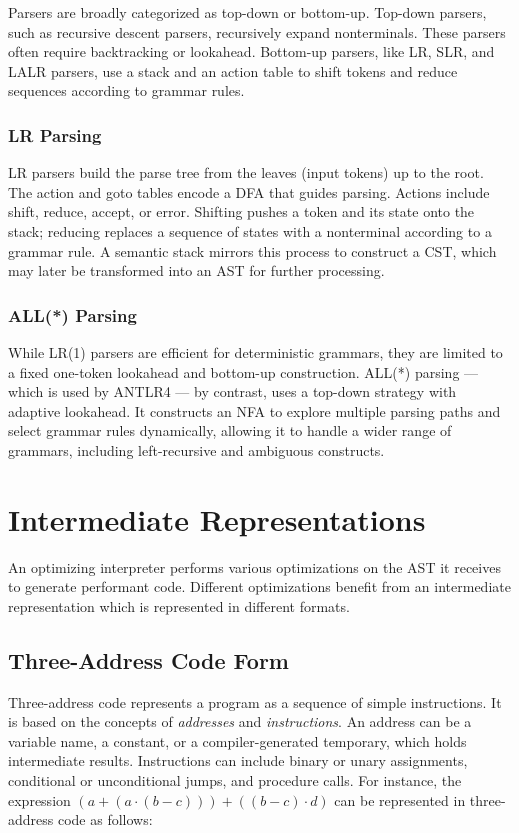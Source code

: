 Parsers are broadly categorized as top-down or bottom-up. Top-down parsers, such as recursive descent parsers, recursively expand nonterminals. These parsers often require backtracking or lookahead. Bottom-up parsers, like LR, SLR, and LALR parsers, use a stack and an action table to shift tokens and reduce sequences according to grammar rules\cite{kegler2014}.

\subsubsection{LR Parsing}
LR parsers build the parse tree from the leaves (input tokens) up to the root. The action and goto tables encode a \ac{DFA} that guides parsing. Actions include shift, reduce, accept, or error. Shifting pushes a token and its state onto the stack; reducing replaces a sequence of states with a nonterminal according to a grammar rule. A semantic stack mirrors this process to construct a \ac{CST}, which may later be transformed into an \ac{AST} for further processing\cite{suresh2019}.

\subsubsection{ALL(*) Parsing}

While LR(1) parsers are efficient for deterministic grammars, they are limited to a fixed one-token lookahead and bottom-up construction. ALL(*) parsing --- which is used by ANTLR4 --- by contrast, uses a top-down strategy with adaptive lookahead. It constructs an \ac{NFA} to explore multiple parsing paths and select grammar rules dynamically, allowing it to handle a wider range of grammars, including left-recursive and ambiguous constructs.

\section{Intermediate Representations}

An optimizing interpreter performs various optimizations on the \ac{AST} it receives to generate performant code. Different optimizations benefit from an intermediate representation which is represented in different formats.

\subsection{Three-Address Code Form}

Three-address code represents a program as a sequence of simple instructions. It is based on the concepts of \emph{addresses} and \emph{instructions}. An address can be a variable name, a constant, or a compiler-generated temporary, which holds intermediate results. Instructions can include binary or unary assignments, conditional or unconditional jumps, and procedure calls\cite{dragon-book}. For instance, the expression $(a + (a \cdot (b - c))) + ((b - c) \cdot d)$ can be represented in three-address code as follows:

